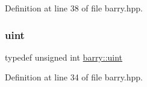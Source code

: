 Definition at line 38 of file barry.\+hpp.

\mbox{\label{namespacebarry_a11dfc53ddb4672278319aa04f1e09a6c}} 
\subsubsection{\texorpdfstring{uint}{uint}}
{\footnotesize\ttfamily typedef unsigned int \hyperlink{namespacebarry_a11dfc53ddb4672278319aa04f1e09a6c}{barry\+::uint}}



Definition at line 34 of file barry.\+hpp.

